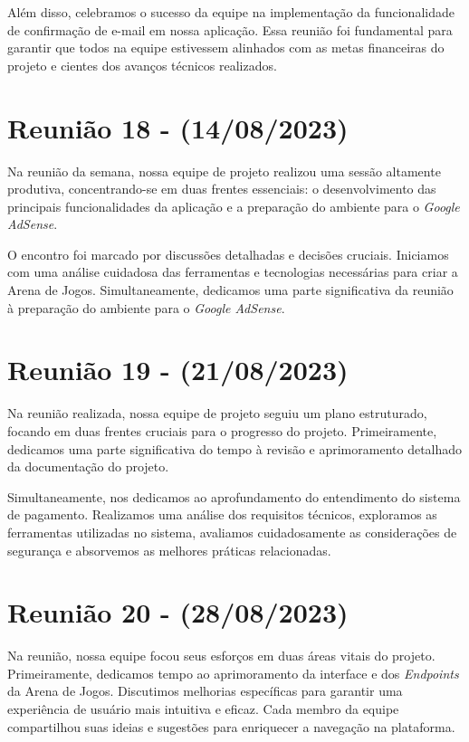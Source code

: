 \begin{apendicesenv}
Além disso, celebramos o sucesso da equipe na implementação da funcionalidade de confirmação de e-mail em nossa aplicação. Essa reunião foi fundamental para garantir que todos na equipe estivessem alinhados com as metas financeiras do projeto e cientes dos avanços técnicos realizados.

\section{Reunião 18 - (14/08/2023)}
Na reunião da semana, nossa equipe de projeto realizou uma sessão altamente produtiva, concentrando-se em duas frentes essenciais: o desenvolvimento das principais funcionalidades da aplicação e a preparação do ambiente para o \textit{Google AdSense}.

O encontro foi marcado por discussões detalhadas e decisões cruciais. Iniciamos com uma análise cuidadosa das ferramentas e tecnologias necessárias para criar a Arena de Jogos. Simultaneamente, dedicamos uma parte significativa da reunião à preparação do ambiente para o \textit{Google AdSense}. 

\section{Reunião 19 - (21/08/2023)}
Na reunião realizada, nossa equipe de projeto seguiu um plano estruturado, focando em duas frentes cruciais para o progresso do projeto. Primeiramente, dedicamos uma parte significativa do tempo à revisão e aprimoramento detalhado da documentação do projeto. 

Simultaneamente, nos dedicamos ao aprofundamento do entendimento do sistema de pagamento. Realizamos uma análise dos requisitos técnicos, exploramos as ferramentas utilizadas no sistema, avaliamos cuidadosamente as considerações de segurança e absorvemos as melhores práticas relacionadas.

\section{Reunião 20 - (28/08/2023)}
Na reunião, nossa equipe focou seus esforços em duas áreas vitais do projeto. Primeiramente, dedicamos tempo ao aprimoramento da interface e dos \textit{\gls{Endpoints}} da Arena de Jogos. Discutimos melhorias específicas para garantir uma experiência de usuário mais intuitiva e eficaz. Cada membro da equipe compartilhou suas ideias e sugestões para enriquecer a navegação na plataforma.


\end{apendicesenv}
